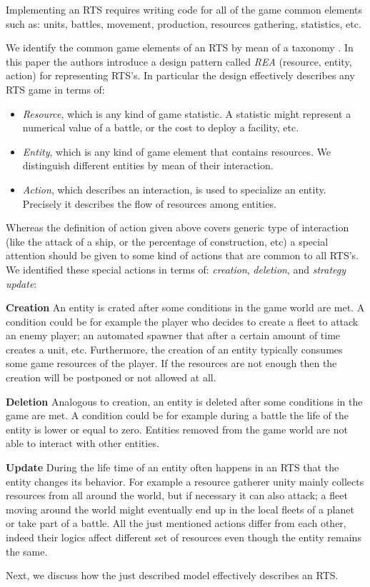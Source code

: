 Implementing an RTS requires writing code for all of the game common elements such as: units, battles, movement, production, resources gathering, statistics, etc.

We identify the common game elements of an RTS by mean of a taxonomy \cite{abbadi2014resource}. In this paper the authors introduce a design pattern called \textit{REA} (resource, entity, action) for representing RTS's. In particular the design effectively describes any RTS game in terms of:
\begin{itemize}[noitemsep,nolistsep]
\item \textit{Resource}, which is any kind of game statistic. A statistic might represent a numerical value of a battle, or the cost to deploy a facility, etc.
\item \textit{Entity}, which is any kind of game element that contains resources. We distinguish different entities by mean of their interaction.
\item \textit{Action}, which describes an interaction, is used to specialize an entity. Precisely it describes the flow of resources among entities.
\end{itemize}


\noindent
\newline
Whereas the definition of action given above covers generic type of interaction (like the attack of a ship, or the percentage of construction, etc) a special attention should be given to some kind of actions that are common to all RTS's. We identified these special actions in terms of: \textit{creation}, \textit{deletion}, and \textit{strategy update}:

\noindent
\newline
\textbf{Creation}
An entity is crated after some conditions in the game world are met. A condition could be for example the player who decides to create a fleet to attack an enemy player; an automated spawner that after a certain amount of time creates a unit, etc. Furthermore, the creation of an entity typically consumes some game resources of the player. If the resources are not enough then the creation will be postponed or not allowed at all. 

\noindent
\newline
\textbf{Deletion}
Analogous to creation, an entity is deleted after some conditions in the game are met. A condition could be for example during a battle the life of the entity is lower or equal to zero. Entities removed from the game world are not able to interact with other entities.

\noindent
\newline
\textbf{Update}
During the life time of an entity often happens in an RTS that the entity changes its behavior. For example a resource gatherer unity mainly collects resources from all around the world, but if necessary it can also attack; a fleet moving around the world might eventually end up in the local fleets of a planet or take part of a battle. All the just mentioned actions differ from each other, indeed their logics affect different set of resources even though the entity remains the same.

Next, we discuss how the just described model effectively describes an RTS. 